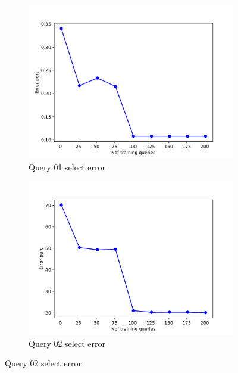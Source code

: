 \begin{figure}[!htb]
  \begin{subfigure}[t]{0.5\textwidth}
    \includegraphics[scale=0.4]{figs/tpch10/tpch10_sel01_error.pdf}
    \caption{Query 01 select error}
    \label{fig:tpch_sel01}
  \end{subfigure}
  \begin{subfigure}[t]{0.5\textwidth}
    \includegraphics[scale=0.4]{figs/tpch10/tpch10_sel02_error.pdf}
    \caption{Query 02 select error}
    \label{fig:tpch_sel02}
   \end{subfigure}


\end{figure}
